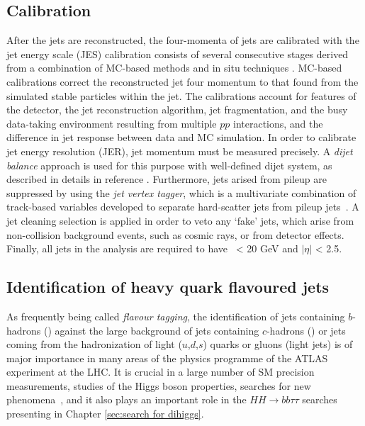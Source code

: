 \subsection{Calibration}
After the jets are reconstructed, the four-momenta of jets
are calibrated with the jet energy scale (JES) calibration
consists of several consecutive stages derived from a
combination of MC-based methods and in situ techniques \cite{PERF-2016-04}.
MC-based calibrations correct the reconstructed jet four momentum 
to that found from the simulated stable particles 
within the jet. 
The calibrations account for features of the
detector, the jet reconstruction algorithm, jet fragmentation,
and the busy data-taking environment resulting from multiple $pp$ 
interactions, and the difference in jet response between
data and MC simulation.
In order to calibrate jet energy resolution (JER),
jet momentum must be measured precisely. A \textit{dijet balance}
approach is used for this purpose with well-defined dijet system,
as described in details in reference \cite{JETM-2018-05}.
Furthermore, jets arised from pileup are suppressed by using the 
\textit{jet vertex tagger}, which is a multivariate 
combination of track-based variables developed to separate 
hard-scatter jets from pileup jets~\cite{ATLAS-CONF-2014-018}.
A jet cleaning selection is applied in order to veto any `fake' jets, 
which arise from non-collision background events, such as cosmic rays, 
or from detector effects. 
Finally, all jets in the analysis are required to have \pt\ < 20 GeV 
and $|\eta|$ < 2.5.


\subsection{Identification of heavy quark flavoured jets}
\label{sec:Flavour tagging}
As frequently being called \textit{flavour tagging}, 
the identification of jets containing $b$-hadrons (\bjets) 
against the large background of jets containing $c$-hadrons 
(\cjets) or jets coming from the hadronization of light ($u$,$d$,$s$) 
quarks or gluons (light jets) is of major importance in many areas of the 
physics programme of the ATLAS experiment at the LHC. 
It is crucial in a large number of SM
precision measurements, studies of the Higgs boson properties, 
searches for new phenomena~\cite{SUSY-2014-08, ATLAS-CONF-2018-043,Interpreting_Higgs_result},
and it also plays an important role in 
the $HH \to bb\tau\tau$ searches presenting in Chapter \ref{sec:search for dihiggs}. 



